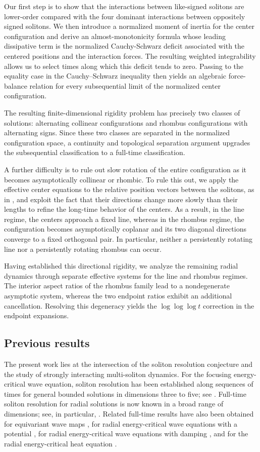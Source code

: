 \documentclass[reqno]{amsart}
\theoremstyle{plain}
\theoremstyle{definition}
\numberwithin{equation}{section}
\begin{document}
Our first step is to show that the interactions between like-signed solitons are lower-order compared with the four dominant interactions between oppositely signed solitons. We then introduce a normalized moment of inertia for the center configuration and derive an almost-monotonicity formula whose leading dissipative term is the normalized Cauchy-Schwarz deficit associated with the centered positions and the interaction forces. The resulting weighted integrability allows us to select times along which this deficit tends to zero. Passing to the equality case in the Cauchy--Schwarz inequality then yields an algebraic force-balance relation for every subsequential limit of the normalized center configuration.

The resulting finite-dimensional rigidity problem has precisely two classes of solutions: alternating collinear configurations and rhombus configurations with alternating signs. Since these two classes are separated in the normalized configuration space, a continuity and topological separation argument upgrades the subsequential classification to a full-time classification.

A further difficulty is to rule out slow rotation of the entire configuration as it becomes asymptotically collinear or rhombic. To rule this out, we apply the effective center equations to the relative position vectors between the solitons, as in \cite{I3}, and exploit the fact that their directions change more slowly than their lengths to refine the long-time behavior of the centers. As a result, in the line regime, the centers approach a fixed line, whereas in the rhombus regime, the configuration becomes asymptotically coplanar and its two diagonal directions converge to a fixed orthogonal pair. In particular, neither a persistently rotating line nor a persistently rotating rhombus can occur.

Having established this directional rigidity, we analyze the remaining radial dynamics through separate effective systems for the line and rhombus regimes. The interior aspect ratios of the rhombus family lead to a nondegenerate asymptotic system, whereas the two endpoint ratios exhibit an additional cancellation. Resolving this degeneracy yields the $\log\log\log t$ correction in the endpoint expansions.


\subsection{Previous results}
The present work lies at the intersection of the soliton resolution conjecture and the study of strongly interacting multi-soliton dynamics. For the focusing energy-critical wave equation, soliton resolution has been established along sequences of times for general bounded solutions in dimensions three to five; see \cite{DJKM}. Full-time soliton resolution for radial solutions is now known in a broad range of dimensions; see, in particular, \cite{DKM2,CDKM,JL4}. Related full-time results have also been obtained for equivariant wave maps \cite{DKMM,JL3}, for radial energy-critical wave equations with a potential \cite{JLX,LMZ}, for radial energy-critical wave equations with damping \cite{GZ}, and for the radial energy-critical heat equation \cite{A1}.
\end{document}
